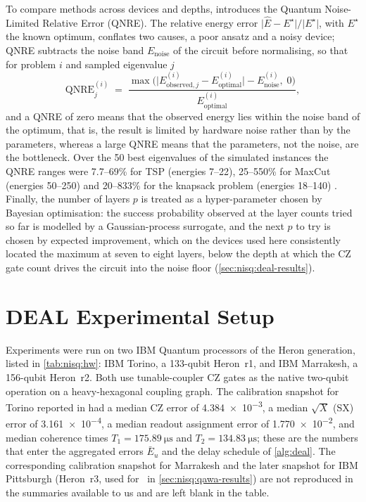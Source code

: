 To compare methods across devices and depths, \cite{guo2025deal} introduces the Quantum Noise-Limited Relative Error (QNRE). The relative energy error $\lvert\hat{E}-E^{\star}\rvert/\lvert E^{\star}\rvert$, with $E^{\star}$ the known optimum, conflates two causes, a poor ansatz and a noisy device; QNRE subtracts the noise band $E_{\mathrm{noise}}$ of the circuit before normalising, so that for problem $i$ and sampled eigenvalue $j$
\begin{equation}\label{eq:nisq:qnre}
  \mathrm{QNRE}^{(i)}_{j} \;=\; \frac{\max\big(\lvert E^{(i)}_{\mathrm{observed},j}-E^{(i)}_{\mathrm{optimal}}\rvert - E^{(i)}_{\mathrm{noise}},\;0\big)}{E^{(i)}_{\mathrm{optimal}}},
\end{equation}
and a QNRE of zero means that the observed energy lies within the noise band of the optimum, that is, the result is limited by hardware noise rather than by the parameters, whereas a large QNRE means that the parameters, not the noise, are the bottleneck. Over the 50 best eigenvalues of the simulated instances the QNRE ranges were 7.7--69\% for TSP (energies 7--22), 25--550\% for MaxCut (energies 50--250) and 20--833\% for the knapsack problem (energies 18--140) \cite{guo2025deal}. Finally, the number of layers $p$ is treated as a hyper-parameter chosen by Bayesian optimisation: the success probability observed at the layer counts tried so far is modelled by a Gaussian-process surrogate, and the next $p$ to try is chosen by expected improvement, which on the devices used here consistently located the maximum at seven to eight layers, below the depth at which the CZ gate count drives the circuit into the noise floor (\cref{sec:nisq:deal-results}).

\section{DEAL Experimental Setup}\label{sec:nisq:deal-setup}

Experiments were run on two IBM Quantum processors of the Heron generation, listed in \cref{tab:nisq:hw}: IBM Torino, a 133-qubit Heron~r1, and IBM Marrakesh, a 156-qubit Heron~r2. Both use tunable-coupler CZ gates as the native two-qubit operation on a heavy-hexagonal coupling graph. The calibration snapshot for Torino reported in \cite{guo2025deal} had a median CZ error of \num{4.384e-3}, a median $\sqrt{X}$ (SX) error of \num{3.161e-4}, a median readout assignment error of \num{1.770e-2}, and median coherence times $T_{1}=\SI{175.89}{\micro\second}$ and $T_{2}=\SI{134.83}{\micro\second}$; these are the numbers that enter the aggregated errors $\bar{E}_{u}$ and the delay schedule of \cref{alg:deal}. The corresponding calibration snapshot for Marrakesh and the later snapshot for IBM Pittsburgh (Heron~r3, used for \qawa\ in \cref{sec:nisq:qawa-results}) are not reproduced in the summaries available to us and are left blank in the table.

